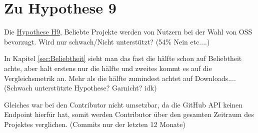 





\section{Zu Hypothese 9}
Die \hyperref[H:9]{Hypothese H9}, Beliebte Projekte werden von Nutzern bei der Wahl von OSS bevorzugt.
Wird nur schwach/Nicht unterstützt? (54\% Nein etc....)

In Kapitel \ref{sec:Beliebtheit} sieht man das fast die hälfte schon auf Beliebtheit achte, aber halt
erstens nur die hälfte und zweites kommt es auf die Vergleichsmetrik an. Mehr als die hälfte zumindest
achtet auf Downloads.... (Schwach unterstützte Hypothese? Garnicht? idk)










Gleiches war bei den Contributor nicht umsetzbar, da die GitHub API keinen
Endpoint hierfür hat, somit werden Contributor über den gesamten Zeitraum des Projektes verglichen. (Commits nur der letzten 12 Monate)


